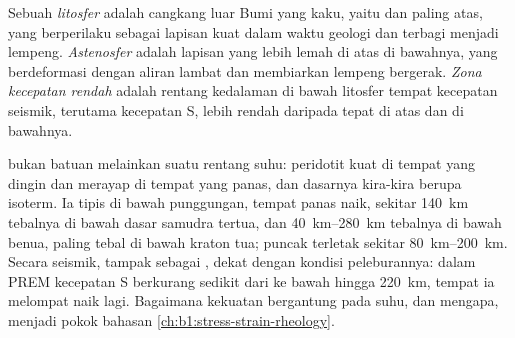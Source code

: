 \begin{definition}
\label{def:b1:layered-earth:lithosphere}
Sebuah \emph{litosfer} adalah cangkang luar Bumi yang kaku, yaitu  dan  paling atas, yang berperilaku sebagai lapisan kuat dalam waktu geologi dan terbagi menjadi lempeng. \emph{Astenosfer} adalah lapisan yang lebih lemah di  atas di bawahnya, yang berdeformasi dengan aliran lambat dan membiarkan lempeng bergerak. \emph{Zona kecepatan rendah} adalah rentang kedalaman di bawah litosfer tempat kecepatan seismik, terutama kecepatan S, lebih rendah daripada tepat di atas dan di bawahnya.
\end{definition}

 bukan batuan melainkan suatu rentang suhu: peridotit  kuat di tempat yang dingin dan merayap di tempat yang panas, dan dasarnya kira-kira berupa isoterm. Ia tipis di bawah punggungan, tempat  panas naik, sekitar \qty{140}{km} tebalnya di bawah dasar samudra tertua, dan \qtyrange{40}{280}{km} tebalnya di bawah benua, paling tebal di bawah kraton tua; puncak  terletak sekitar \qtyrange{80}{200}{km}. Secara seismik,  tampak sebagai , dekat dengan kondisi peleburannya: dalam PREM kecepatan S berkurang sedikit dari  ke bawah hingga \qty{220}{km}, tempat ia melompat naik lagi. Bagaimana kekuatan bergantung pada suhu, dan mengapa, menjadi pokok bahasan \cref{ch:b1:stress-strain-rheology}.

